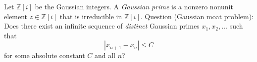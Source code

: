 Let $\mathbb Z[i]$ be the Gaussian integers. A \emph{Gaussian prime} is a nonzero nonunit element $z\in\mathbb Z[i]$ that is irreducible in $\mathbb Z[i]$.
Question (Gaussian moat problem):
Does there exist an infinite sequence of \emph{distinct} Gaussian primes $x_1,x_2,\dots$ such that
\[
|x_{n+1}-x_n|\le C
\]
for some absolute constant $C$ and all $n$?
